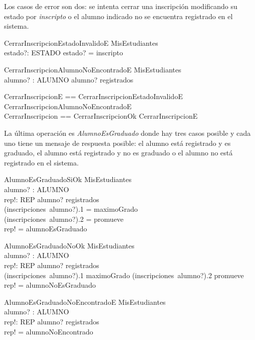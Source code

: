 \documentclass{article}
\begin{document}
Los casos de error son dos: se intenta cerrar una inscripción modificando su estado por \emph{inscripto} o el alumno indicado no se encuentra registrado en el sistema.

\begin{schema}{CerrarInscripcionEstadoInvalidoE}
    \Xi MisEstudiantes \\
    estado?: ESTADO
    \where
    estado? = inscripto
\end{schema}

\begin{schema}{CerrarInscripcionAlumnoNoEncontradoE}
    \Xi MisEstudiantes \\
    alumno? : ALUMNO
    \where
    alumno? \notin registrados
\end{schema}

\begin{zed}
    CerrarInscripcionE == CerrarInscripcionEstadoInvalidoE \lor CerrarInscripcionAlumnoNoEncontradoE \\
    CerrarInscripcion == CerrarInscripcionOk \lor CerrarInscripcionE
\end{zed}

La última operación es \emph{AlumnoEsGraduado} donde hay tres casos posible y cada uno tiene un mensaje de respuesta posible: el alumno está registrado y es graduado, el alumno está registrado y no es graduado o el alumno no está registrado en el sistema.
\begin{schema}{AlumnoEsGraduadoSiOk}
    \Xi MisEstudiantes \\
    alumno? : ALUMNO \\
    rep!: REP
    \where
    alumno? \in registrados \\
    (inscripciones~alumno?).1 = maximoGrado \\
    (inscripciones~alumno?).2 = promueve \\
    rep! = alumnoEsGraduado
\end{schema}

\begin{schema}{AlumnoEsGraduadoNoOk}
    \Xi MisEstudiantes \\
    alumno? : ALUMNO \\
    rep!: REP
    \where
    alumno? \in registrados \\
    (inscripciones~alumno?).1 \neq maximoGrado \lor (inscripciones~alumno?).2 \neq promueve \\
    rep! = alumnoNoEsGraduado
\end{schema}

\begin{schema}{AlumnoEsGraduadoNoEncontradoE}
    \Xi MisEstudiantes \\
    alumno? : ALUMNO \\
    rep!: REP
    \where
    alumno? \notin registrados \\
    rep! = alumnoNoEncontrado
\end{schema}
\end{document}
